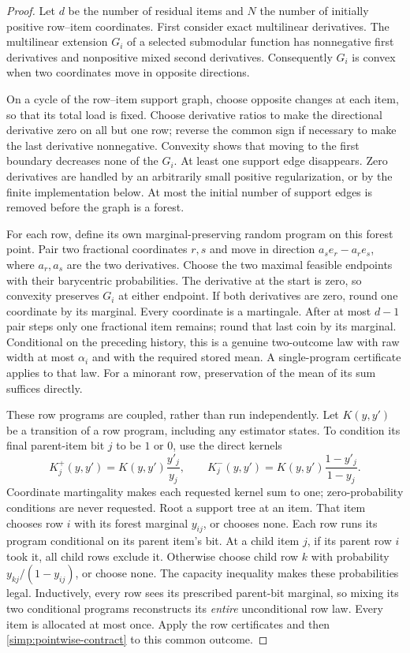 \begin{proof}
Let $d$ be the number of residual items and $N$ the number of initially
positive row--item coordinates.
First consider exact multilinear derivatives.  The multilinear
extension $G_i$ of a selected submodular function has nonnegative first
derivatives and nonpositive mixed second derivatives.  Consequently
$G_i$ is convex when two coordinates move in opposite directions.

On a cycle of the row--item support graph, choose opposite changes
at each item, so that its total load is fixed.  Choose derivative
ratios to make the directional derivative zero on all but one row;
reverse the common sign if necessary to make the last derivative
nonnegative.  Convexity shows that moving to the first boundary
decreases none of the $G_i$.  At least one support edge disappears.
Zero derivatives are handled by an arbitrarily small positive
regularization, or by the finite implementation below.  At most the
initial number of support edges is removed before the graph is a forest.

For each row, define its own marginal-preserving random program on this
forest point.  Pair two fractional coordinates $r,s$ and move in
direction $a_s e_r-a_r e_s$, where $a_r,a_s$ are the two derivatives.
Choose the two maximal feasible endpoints with their barycentric
probabilities.  The derivative at the start is zero, so convexity
preserves $G_i$ at either endpoint.  If both derivatives are zero,
round one coordinate by its marginal.  Every coordinate is a
martingale.  After at most $d-1$ pair steps only one fractional item
remains; round that last coin by its marginal.  Conditional on the
preceding history, this is a genuine two-outcome law with raw width
at most $\alpha_i$ and with the required stored mean.  A single-program
certificate applies to that law.  For a minorant row, preservation
of the mean of its sum suffices directly.

These row programs are coupled, rather than run independently.
Let $K(y,y')$ be a transition of a row program, including any estimator
states.  To condition its final parent-item bit $j$ to be $1$ or $0$,
use the direct kernels
\[
 K_j^+(y,y')=K(y,y')\frac{y'_j}{y_j},\qquad
 K_j^-(y,y')=K(y,y')\frac{1-y'_j}{1-y_j}.
\]
Coordinate martingality makes each requested kernel sum to one;
zero-probability conditions are never requested.  Root a support tree
at an item.  That item chooses row $i$ with its forest marginal $y_{ij}$,
or chooses none.  Each row runs its program conditional on its parent
item's bit.  At a child item $j$, if its parent row $i$ took it, all
child rows exclude it.  Otherwise choose child row $k$ with probability
$y_{kj}/(1-y_{ij})$, or choose none.  The capacity inequality makes
these probabilities legal.  Inductively, every row sees its prescribed
parent-bit marginal, so mixing its two conditional programs reconstructs
its \emph{entire} unconditional row law.  Every item is allocated at
most once.  Apply the row certificates and then
\eqref{simp:pointwise-contract} to this common outcome.


\end{proof}
